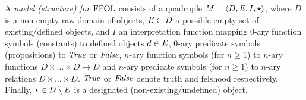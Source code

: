 \begin{defn}
  A \emph{model (structure) for $\text{\textrm{FFOL}}$} consists of a quadruple
  $M = \langle D, \mathit{E}, I, \star\rangle$, where $D$ is a non-empty raw domain of
  objects, $\mathit{E}\subset D$ a possible empty set of existing/defined objects, and $I$ an interpretation function
  mapping $0$-ary function symbols (constants) to defined objects $d\in \mathit{E}$, 
 $0$-ary predicate symbols (propositions) to $\mathit{True}$ or $\mathit{False}$, 
  $n$-ary function symbols (for $n\geq 1$) to $n$-ary functions
  $D \times \ldots \times D \longrightarrow D$ and $n$-ary predicate
  symbols (for $n\geq 1$) to $n$-ary relations
  $D \times \ldots \times D$. $\mathit{True}$ or $\mathit{False}$ denote truth and
  felshood respectively. Finally, $\star\in D\setminus \mathit{E}$ is a designated
  (non-existing/undefined) object. 
\end{defn}

